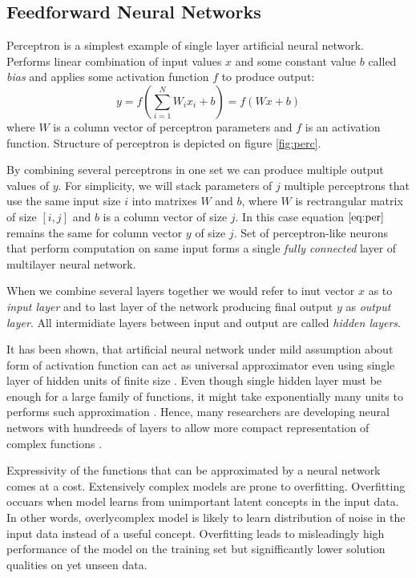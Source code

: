 \subsection{Feedforward Neural Networks}
\label{ch:ffnn}

Perceptron is a simplest example of single layer artificial neural network.
Performs linear combination of input values $x$ and some constant value $b$ called \textit{bias} and applies some activation function $f$ to produce output:
\begin{equation}\label{eq:per}
  y = f(\sum_{i=1}^N W_ix_i + b) = f(Wx+b)
\end{equation}
where $W$ is a column vector of perceptron parameters and $f$ is an activation function. Structure of perceptron is depicted on figure \ref{fig:perc}.



By combining several perceptrons in one set we can produce multiple output values of $y$.
For simplicity, we will stack parameters of $j$ multiple perceptrons that use the same input size $i$ into matrixes $W$ and $b$, where $W$ is rectrangular matrix of size $[i,j]$ and $b$ is a column vector of size $j$.
In this case equation $\ref{eq:per}$ remains the same for column vector $y$ of size $j$. Set of perceptron-like neurons that perform computation on same input forms a single \textit{fully connected} layer of multilayer neural network.

When we combine several layers together we would refer to inut vector $x$ as to \textit{input layer} and to last layer of the network producing final output $y$ as \textit{output layer}. All intermidiate layers between input and output are called \textit{hidden layers}.

It has been shown, that artificial neural network under mild assumption about form of activation function can act as universal approximator even using single layer of hidden units of finite size \cite{Debao1993}.
Even though single hidden layer must be enough for a large family of functions, it might take exponentially many units to performs such approximation \cite{Pascanu2014}.
Hence, many researchers are developing neural networs with hundreeds of layers to allow more compact representation of complex functions \cite{He2015, Srivastava2015}.

Expressivity of the functions that can be approximated by a neural network comes at a cost.
Extensively complex models are prone to overfitting. Overfitting occuars when model learns from unimportant latent concepts in the input data.
In other words, overlycomplex model is likely to learn distribution of noise in the input data instead of a useful concept.
Overfitting leads to misleadingly high performance of the model on the training set but signifficantly lower solution qualities on yet unseen data.

